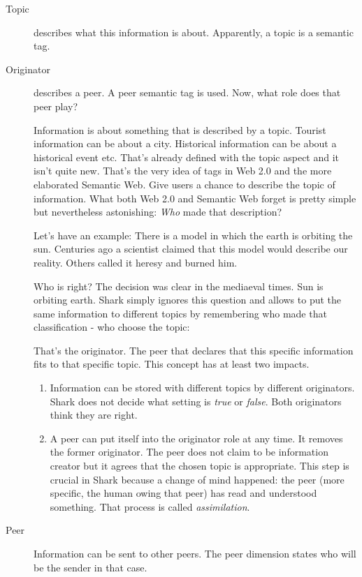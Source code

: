 \begin{description}
    \item[Topic] describes what this information is about. Apparently, a topic is a semantic tag. 
    \item[Originator] describes a peer. A peer semantic tag is used. Now, what role does that peer play? 

Information is about something that is described by a topic. Tourist information can be about a city. Historical information can be about a historical event etc. That's already defined with the topic aspect and it isn't quite new. That's the very idea of tags in Web 2.0 and the more elaborated Semantic Web. Give users a chance to describe the topic of information. What both Web 2.0 and Semantic Web forget is pretty simple but nevertheless astonishing:
{\it Who} made that description?

Let's have an example:
There is a model in which the earth is orbiting the sun. Centuries ago a scientist claimed that this model would describe our reality. Others called it heresy and burned him.  

Who is right? The decision was clear in the  mediaeval times. Sun is orbiting earth. Shark simply ignores this question and allows to put the same information to different topics by remembering who made that classification - who choose the topic:

That's the originator. The peer that declares that this specific information fits to that specific topic. This concept has at least two impacts.

\begin{enumerate}
\item 
Information can be stored with different topics by different originators. Shark does not decide what setting is {\it true} or {\it false}. Both originators think they are right.

\item 
A peer can put itself into the originator role at any time. It removes the former originator. The peer does not claim to be information creator but it agrees that the chosen topic is appropriate. This step is crucial in Shark because a change of mind happened: the peer (more specific, the human owing that peer) has read and understood something. That process is called {\it assimilation}.
\end{enumerate}

    \item[Peer] Information can be sent to other peers. The peer dimension states who will be the sender in that case.


\end{description}
